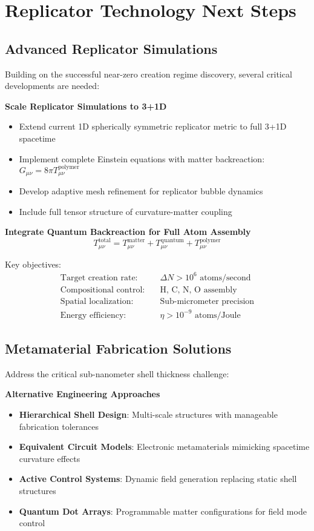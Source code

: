 \documentclass[11pt]{article}
\begin{document}
\section{Replicator Technology Next Steps}

\subsection{Advanced Replicator Simulations}

Building on the successful near-zero creation regime discovery, several critical developments are needed:

\textbf{Scale Replicator Simulations to 3+1D}
\begin{itemize}
\item Extend current 1D spherically symmetric replicator metric to full 3+1D spacetime
\item Implement complete Einstein equations with matter backreaction: $G_{\mu\nu} = 8\pi T_{\mu\nu}^{\text{polymer}}$
\item Develop adaptive mesh refinement for replicator bubble dynamics
\item Include full tensor structure of curvature-matter coupling
\end{itemize}

\textbf{Integrate Quantum Backreaction for Full Atom Assembly}
\begin{equation}
T_{\mu\nu}^{\text{total}} = T_{\mu\nu}^{\text{matter}} + T_{\mu\nu}^{\text{quantum}} + T_{\mu\nu}^{\text{polymer}}
\end{equation}

Key objectives:
\begin{align}
\text{Target creation rate:} &\quad \Delta N > 10^{6} \text{ atoms/second} \\
\text{Compositional control:} &\quad \text{H, C, N, O assembly} \\
\text{Spatial localization:} &\quad \text{Sub-micrometer precision} \\
\text{Energy efficiency:} &\quad \eta > 10^{-9} \text{ atoms/Joule}
\end{align}

\subsection{Metamaterial Fabrication Solutions}

Address the critical sub-nanometer shell thickness challenge:

\textbf{Alternative Engineering Approaches}
\begin{itemize}
\item \textbf{Hierarchical Shell Design}: Multi-scale structures with manageable fabrication tolerances
\item \textbf{Equivalent Circuit Models}: Electronic metamaterials mimicking spacetime curvature effects
\item \textbf{Active Control Systems}: Dynamic field generation replacing static shell structures
\item \textbf{Quantum Dot Arrays}: Programmable matter configurations for field mode control
\end{itemize}
\end{document}
